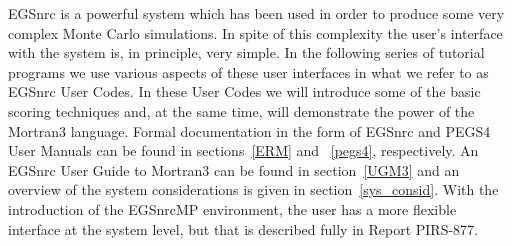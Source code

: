 
%
%
%
%
%
%
%
%
%


\vspace*{-3mm}

\label{tutorials}

EGSnrc is a powerful system which has been used in order to produce some
very complex Monte Carlo simulations.  In spite of this complexity the
user's interface with the system is, in principle, very simple.  In the
following series of tutorial programs we use various aspects of these
user interfaces in what we refer to as EGSnrc User Codes.  In these
User Codes we will introduce some of the basic scoring techniques and,
at the same time, will demonstrate the power of the Mortran3 language.
Formal documentation in the form of EGSnrc and PEGS4 User Manuals can be
found in sections~\ref{ERM} and ~\ref{pegs4}, respectively.  An EGSnrc
User Guide to Mortran3 can be found in section~\ref{UGM3} and an overview
of the system considerations is given in section~\ref{sys_consid}. With
the introduction of the EGSnrcMP environment, the user has a more
flexible interface at the system level, but that is described fully in
Report PIRS-877\cite{Ka03}.


